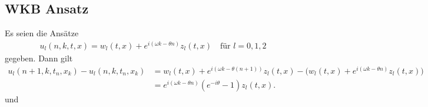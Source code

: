 \subsection{WKB Ansatz}

Es seien die Ansätze 
\begin{align}\label{wkb:ansatz}
u_l(n,k,t,x) = w_l(t,x) + e^{i (\omega k - \theta n)} z_l(t,x) \quad \text{für $l=0,1,2$}
\end{align}
gegeben. Dann gilt
{\small\begin{align}\nonumber
u_l(n+1,k,t_n,x_k) - u_l(n,k,t_n,x_k)
&= w_l(t,x) + e^{i (\omega k - \theta (n+1))} z_l(t,x) - \bigl( w_l(t,x) + e^{i (\omega k - \theta n)} z_l(t,x) \bigr)\\
&= e^{i (\omega k - \theta n)} (e^{-i\theta} - 1) z_l(t,x).
\end{align}}
und
